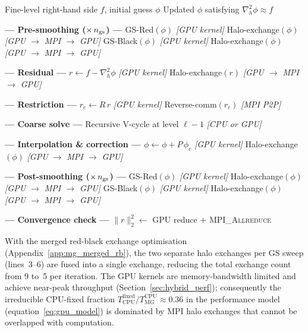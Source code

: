 \documentclass[fleqn,usenatbib]{mnras}
\begin{document}
\begin{algorithm}
\caption{GPU-accelerated V-cycle at AMR level $\ell$}
\label{alg:vcycle}
\begin{algorithmic}[1]
\REQUIRE Fine-level right-hand side $f$, initial guess $\phi$
\ENSURE  Updated $\phi$ satisfying $\nabla^2_h\phi\approx f$
\medskip

\STATE \textbf{--- Pre-smoothing ($\times\,n_{\rm gs}$) ---}
  \STATE GS-Red$(\phi)$           \hfill\textit{[GPU kernel]}
  \STATE Halo-exchange$(\phi)$    \hfill\textit{[GPU $\to$ MPI $\to$ GPU]}
  \STATE GS-Black$(\phi)$         \hfill\textit{[GPU kernel]}
  \STATE Halo-exchange$(\phi)$    \hfill\textit{[GPU $\to$ MPI $\to$ GPU]}
\ENDFOR

\medskip
\STATE \textbf{--- Residual ---}
\STATE $r \leftarrow f - \nabla^2_h\phi$ \hfill\textit{[GPU kernel]}
\STATE Halo-exchange$(r)$         \hfill\textit{[GPU $\to$ MPI $\to$ GPU]}

\medskip
\STATE \textbf{--- Restriction ---}
\STATE $r_c \leftarrow R\,r$      \hfill\textit{[GPU kernel]}
\STATE Reverse-comm$(r_c)$        \hfill\textit{[MPI P2P]}

\medskip
\STATE \textbf{--- Coarse solve ---}
\STATE Recursive V-cycle at level $\ell-1$ \hfill\textit{[CPU or GPU]}

\medskip
\STATE \textbf{--- Interpolation \& correction ---}
\STATE $\phi \leftarrow \phi + P\,\phi_c$ \hfill\textit{[GPU kernel]}
\STATE Halo-exchange$(\phi)$      \hfill\textit{[GPU $\to$ MPI $\to$ GPU]}

\medskip
\STATE \textbf{--- Post-smoothing ($\times\,n_{\rm gs}$) ---}
  \STATE GS-Red$(\phi)$           \hfill\textit{[GPU kernel]}
  \STATE Halo-exchange$(\phi)$    \hfill\textit{[GPU $\to$ MPI $\to$ GPU]}
  \STATE GS-Black$(\phi)$         \hfill\textit{[GPU kernel]}
  \STATE Halo-exchange$(\phi)$    \hfill\textit{[GPU $\to$ MPI $\to$ GPU]}
\ENDFOR

\medskip
\STATE \textbf{--- Convergence check ---}
\STATE $\|r\|_2^2 \leftarrow$ GPU reduce $+$ \textsc{MPI\_Allreduce}
\end{algorithmic}
\end{algorithm}

With the merged red-black exchange optimisation
(Appendix~\ref{app:mg_merged_rb}), the two separate halo exchanges per
GS sweep (lines~3--6) are fused into a single exchange, reducing the
total exchange count from 9 to~5 per iteration.  The GPU kernels are
memory-bandwidth limited and achieve near-peak throughput
(Section~\ref{sec:hybrid_perf}); consequently the irreducible CPU-fixed fraction
$T_{\mathrm{CPU}}^{\mathrm{fixed}}/T_{\mathrm{MG}}^{\mathrm{CPU}}
\approx 0.36$ in the performance model (equation~\ref{eq:gpu_model})
is dominated by MPI halo exchanges that cannot be overlapped with
computation.
\end{document}
